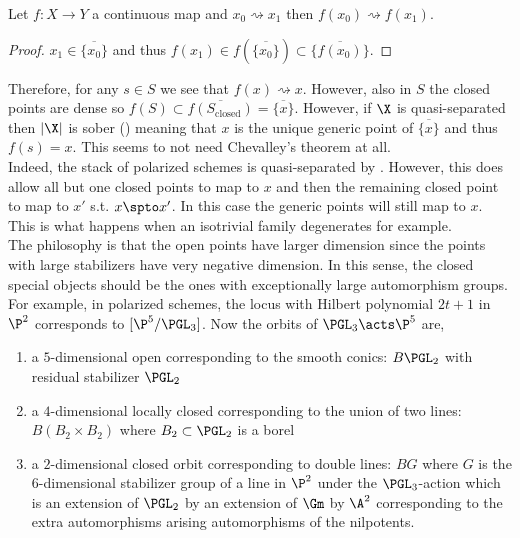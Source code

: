 \documentclass[12pt]{article}
\begin{document}
\begin{lemma}
Let $f : X \to Y$ a continuous map and $x_0 \rightsquigarrow x_1$ then $f(x_0) \rightsquigarrow f(x_1)$.
\end{lemma}

\begin{proof}
$x_1 \in \overline{ \{ x_0 \} }$ and thus $f(x_1) \in f(\overline{ \{ x_0 \}}) \subset \overline{\{ f(x_0) \}}$.
\end{proof}

Therefore, for any $s \in S$ we see that $f(x) \rightsquigarrow x$. However, also in $S$ the closed points are dense so $f(S) \subset \overline{f(S_{\text{closed}})} = \overline{ \{ x \} }$. However, if $\X$ is quasi-separated then $|\X|$ is sober () meaning that $x$ is the unique generic point of $\overline{ \{ x \} }$ and thus $f(s) = x$. This seems to not need Chevalley's theorem at all. 
\bigskip\\
Indeed, the stack of polarized schemes is quasi-separated by . However, this does allow all but one closed points to map to $x$ and then the remaining closed point to map to $x'$ s.t. $x \spto x'$. In this case the generic points will still map to $x$. This is what happens when an isotrivial family degenerates for example.
\bigskip\\
The philosophy is that the open points have larger dimension since the points with large stabilizers have very negative dimension. In this sense, the closed special objects should be the ones with exceptionally large automorphism groups. For example, in polarized schemes, the locus with Hilbert polynomial $2 t + 1$ in $\P^2$ corresponds to $[\P^5 / \PGL_3]$. Now the orbits of $\PGL_3 \acts \P^5$ are,
\begin{enumerate}
\item a $5$-dimensional open corresponding to the smooth conics: $B \PGL_2$ with residual stabilizer $\PGL_2$ 

\item a $4$-dimensional locally closed corresponding to the union of two lines: $B (B_2 \times B_2)$ where $B_2 \subset \PGL_2$ is a borel 

\item a $2$-dimensional closed orbit corresponding to double lines: $B G$ where $G$ is the $6$-dimensional stabilizer group of a line in $\P^2$ under the $\PGL_3$-action which is an extension of $\PGL_2$ by an extension of $\Gm$ by $\A^2$ corresponding to the extra automorphisms arising automorphisms of the nilpotents. 
\end{enumerate}
\end{document}
